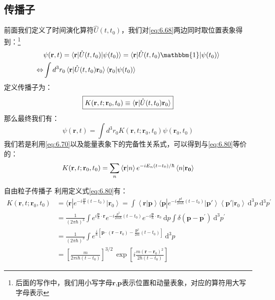 \documentclass[a4paper,zihao=-4,linespread=1]{ctexrep}
\begin{document}
	\subsection*{传播子}
	前面我们定义了时间演化算符$\hat {U}(t,t_0)$，我们对\ref{eq:6.68}两边同时取位置表象得到：\footnote{后面的写作中，我们用小写字母$\mathbf{r}$,$\mathbf{p}$表示位置和动量表象，对应的算符用大写字母表示}
	\begin{align*}
		&\psi(\mathbf{r},t)=\braket{\mathbf{r}|\hat {U}(t,t_0)|\psi(t_0)}=\braket{\mathbf{r}|\hat {U}(t,t_0)\mathbbm{1}|\psi(t_0)}\\
		\Leftrightarrow&\int d^3r_0\braket{\mathbf{r}|\hat {U}(t,t_0)\mathbf{r}_0}\braket{\mathbf{r}_0|\psi(t_0)}
	\end{align*}
	定义传播子为：
	\begin{equation}
		\label{eq:6.80}
		\boxed{
		K(\mathbf{r},t;\mathbf{r}_0,t_0)\equiv \braket{\mathbf{r}|\hat {U}(t,t_0)\mathbf{r}_0}	
	}
	\end{equation}
	那么最终我们有：
	\begin{equation}
		\label{eq:6.81}
		\psi(\mathbf{r},t)=\int d^3r_0	K(\mathbf{r},t;\mathbf{r}_0,t_0)\psi(\mathbf{r}_0,t_0)
	\end{equation}
	我们若是利用\ref{eq:6.70}以及能量表象下的完备性关系式，可以得到与\ref{eq:6.80}等价的：
	\begin{equation}
		K(\mathbf{r},t;\mathbf{r}_0,t_0)=\sum_n\braket{\mathbf{r}|n}e^{-iE_n(t-t_0)/\hbar}\braket{n|\mathbf{r_0}}
	\end{equation}
	\begin{example}{自由粒子传播子}
		利用定义式\ref{eq:6.80}有：
		\begin{equation*}
		\begin{aligned}   K\left( \mathbf{r},t;{{{\mathbf{r}}}_{0}},{{t}_{0}} \right)&=\langle \mathbf{r}|{{e}^{-i\frac{H}{\hbar }\left( t-{{t}_{0}} \right)}}\left| {{{\mathbf{r}}}_{0}} \right\rangle =\int \left\langle \mathbf{r}|\mathbf{p} \right\rangle \langle \mathbf{p}|{{e}^{-i\frac{{{P}^{2}}}{2m\hbar }\left( t-{{t}_{0}} \right)}}\left| {{\mathbf{p}}'} \right\rangle \left\langle {\mathbf{p}}'|{{{\mathbf{r}}}_{0}} \right\rangle \mathrm{~d}^3{p}\mathrm{~d}{^3{p}^\prime}\\&=\frac{1}{{{\left( 2\pi \hbar  \right)}^{3}}}\int{{{e}^{i\frac{{\mathbf{p}}}{\hbar }\cdot \mathbf{r}}}{{e}^{-i\frac{{{p}^{2}}}{2m\hbar }\left( t-{{t}_{0}} \right)}}{{e}^{-i\frac{{\mathbf{p}}}{\hbar }\cdot {{{\mathbf{r}}}_{0}}}}\mathrm{~d}p}\int{\delta \left( \mathbf{p}-{\mathbf{p}}^\prime \right)\mathrm{~d}^3{p^\prime}}
		\\   & =\frac{1}{{{\left( 2\pi \hbar  \right)}^{3}}}\int{{{e}^{\frac{i}{\hbar }\left[ \mathbf{p}\cdot \left( \mathbf{r}-{{{\mathbf{r}}}_{0}} \right)-\frac{{{{\mathbf{p}}}^{2}}}{2m}\left( t-{{t}_{0}} \right) \right]}}\mathrm{~d}^3{p}}\\
		&={{\left[ \frac{m}{2\pi i\hbar \left( t-{{t}_{0}} \right)} \right]}^{{3}/{2}\;}}\exp \left[ i\frac{m{{\left( \mathbf{r}-{{{\mathbf{r}}}_{0}} \right)}^{2}}}{2\hbar \left( t-{{t}_{0}} \right)} \right]
		\end{aligned}
		\end{equation*}
	\end{example}
\end{document}

